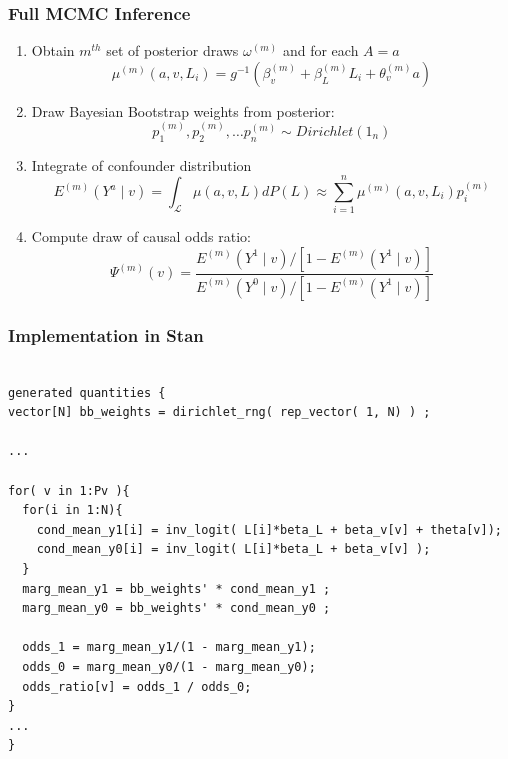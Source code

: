 \documentclass[xcolor=x11names,compress]{beamer}
\renewcommand{\(}{\begin{columns}}
\renewcommand{\)}{\end{columns}}
\newcommand{\<}[1]{\begin{column}{#1}}
\renewcommand{\>}{\end{column}}
\begin{document}
\begin{frame}
	\frametitle{Full MCMC Inference}

	\begin{enumerate}
	\scriptsize
		\item Obtain $m^{th}$ set of posterior draws $\omega^{(m)}$ and for each $A=a$
		$$  \mu^{(m)}( a, v, L_i ) = g^{-1}( \beta_v^{(m)} + \beta_L^{(m)}L_i + \theta_v^{(m)} a )$$
		
		 
		\item Draw Bayesian Bootstrap weights from posterior:
		$$ p_1^{(m)}, p_2^{(m)}, \dots p_n^{(m)} \sim Dirichlet(1_n) $$
		
		 
		\item Integrate of confounder distribution
		$$ E^{(m)}(Y^a \mid v ) = \int_{\mathcal{L}} \mu(a, v, L) dP(L) \approx \sum_{i=1}^n \mu^{(m)}( a, v, L_i ) p_i^{(m)} $$
		
		 
		\item Compute draw of causal odds ratio:
		$$ \Psi^{(m)} (v) = \frac{ E^{(m)}(Y^1 \mid v)/[1-E^{(m)}(Y^1 \mid v)] }{E^{(m)}(Y^0 \mid v)/[1-E^{(m)}(Y^1 \mid v)] } $$
	\end{enumerate}
\end{frame}

\begin{frame}[fragile]
	\frametitle{Implementation in Stan}
	\scriptsize
	\begin{verbatim}
	
generated quantities {
vector[N] bb_weights = dirichlet_rng( rep_vector( 1, N) ) ;

...

for( v in 1:Pv ){
  for(i in 1:N){
    cond_mean_y1[i] = inv_logit( L[i]*beta_L + beta_v[v] + theta[v]);
    cond_mean_y0[i] = inv_logit( L[i]*beta_L + beta_v[v] );
  }
  marg_mean_y1 = bb_weights' * cond_mean_y1 ;
  marg_mean_y0 = bb_weights' * cond_mean_y0 ;
	
  odds_1 = marg_mean_y1/(1 - marg_mean_y1);
  odds_0 = marg_mean_y0/(1 - marg_mean_y0);
  odds_ratio[v] = odds_1 / odds_0;
}
...
}

	\end{verbatim}
\end{frame}
\end{document}
